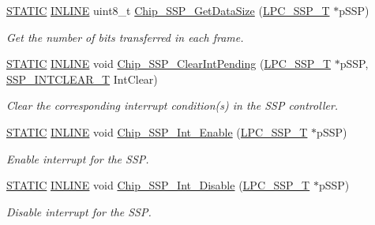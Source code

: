\begin{DoxyCompactItemize}
\hyperlink{group___l_p_c___types___public___macros_ga10b2d890d871e1489bb02b7e70d9bdfb}{S\+T\+A\+T\+IC} \hyperlink{spifi__18xx__43xx_8h_a2eb6f9e0395b47b8d5e3eeae4fe0c116}{I\+N\+L\+I\+NE} uint8\+\_\+t \hyperlink{group___s_s_p__18_x_x__43_x_x_ga421d39f6094d0f335e5acbc3dd5f0b09}{Chip\+\_\+\+S\+S\+P\+\_\+\+Get\+Data\+Size} (\hyperlink{struct_l_p_c___s_s_p___t}{L\+P\+C\+\_\+\+S\+S\+P\+\_\+T} $\ast$p\+S\+SP)
\begin{DoxyCompactList}\small\item\em Get the number of bits transferred in each frame. \end{DoxyCompactList}\item 
\hyperlink{group___l_p_c___types___public___macros_ga10b2d890d871e1489bb02b7e70d9bdfb}{S\+T\+A\+T\+IC} \hyperlink{spifi__18xx__43xx_8h_a2eb6f9e0395b47b8d5e3eeae4fe0c116}{I\+N\+L\+I\+NE} void \hyperlink{group___s_s_p__18_x_x__43_x_x_ga5fe8047a36b3055251cff755d339ca4a}{Chip\+\_\+\+S\+S\+P\+\_\+\+Clear\+Int\+Pending} (\hyperlink{struct_l_p_c___s_s_p___t}{L\+P\+C\+\_\+\+S\+S\+P\+\_\+T} $\ast$p\+S\+SP, \hyperlink{group___s_s_p__18_x_x__43_x_x_gadc98b69a8cb7a5afef8dd81bebbfc66d}{S\+S\+P\+\_\+\+I\+N\+T\+C\+L\+E\+A\+R\+\_\+T} Int\+Clear)
\begin{DoxyCompactList}\small\item\em Clear the corresponding interrupt condition(s) in the S\+SP controller. \end{DoxyCompactList}\item 
\hyperlink{group___l_p_c___types___public___macros_ga10b2d890d871e1489bb02b7e70d9bdfb}{S\+T\+A\+T\+IC} \hyperlink{spifi__18xx__43xx_8h_a2eb6f9e0395b47b8d5e3eeae4fe0c116}{I\+N\+L\+I\+NE} void \hyperlink{group___s_s_p__18_x_x__43_x_x_ga98eb3a788e313aeb5a4feb2516b11e8f}{Chip\+\_\+\+S\+S\+P\+\_\+\+Int\+\_\+\+Enable} (\hyperlink{struct_l_p_c___s_s_p___t}{L\+P\+C\+\_\+\+S\+S\+P\+\_\+T} $\ast$p\+S\+SP)
\begin{DoxyCompactList}\small\item\em Enable interrupt for the S\+SP. \end{DoxyCompactList}\item 
\hyperlink{group___l_p_c___types___public___macros_ga10b2d890d871e1489bb02b7e70d9bdfb}{S\+T\+A\+T\+IC} \hyperlink{spifi__18xx__43xx_8h_a2eb6f9e0395b47b8d5e3eeae4fe0c116}{I\+N\+L\+I\+NE} void \hyperlink{group___s_s_p__18_x_x__43_x_x_ga20c7c516c84ba924973318bd64c113a3}{Chip\+\_\+\+S\+S\+P\+\_\+\+Int\+\_\+\+Disable} (\hyperlink{struct_l_p_c___s_s_p___t}{L\+P\+C\+\_\+\+S\+S\+P\+\_\+T} $\ast$p\+S\+SP)
\begin{DoxyCompactList}\small\item\em Disable interrupt for the S\+SP. \end{DoxyCompactList}\item 

\end{DoxyCompactItemize}

